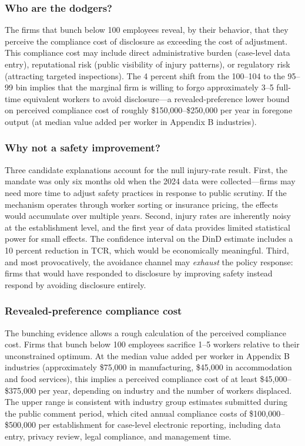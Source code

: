 \documentclass[12pt]{article}
\begin{document}
\subsubsection*{Who are the dodgers?} The firms that bunch below 100 employees reveal, by their behavior, that they perceive the compliance cost of disclosure as exceeding the cost of adjustment. This compliance cost may include direct administrative burden (case-level data entry), reputational risk (public visibility of injury patterns), or regulatory risk (attracting targeted inspections). The 4 percent shift from the 100--104 to the 95--99 bin implies that the marginal firm is willing to forgo approximately 3--5 full-time equivalent workers to avoid disclosure---a revealed-preference lower bound on perceived compliance cost of roughly \$150,000--\$250,000 per year in foregone output (at median value added per worker in Appendix B industries).

\subsubsection*{Why not a safety improvement?} Three candidate explanations account for the null injury-rate result. First, the mandate was only six months old when the 2024 data were collected---firms may need more time to adjust safety practices in response to public scrutiny. If the mechanism operates through worker sorting or insurance pricing, the effects would accumulate over multiple years. Second, injury rates are inherently noisy at the establishment level, and the first year of data provides limited statistical power for small effects. The confidence interval on the DinD estimate includes a 10 percent reduction in TCR, which would be economically meaningful. Third, and most provocatively, the avoidance channel may \textit{exhaust} the policy response: firms that would have responded to disclosure by improving safety instead respond by avoiding disclosure entirely.

\subsubsection*{Revealed-preference compliance cost} The bunching evidence allows a rough calculation of the perceived compliance cost. Firms that bunch below 100 employees sacrifice 1--5 workers relative to their unconstrained optimum. At the median value added per worker in Appendix B industries (approximately \$75,000 in manufacturing, \$45,000 in accommodation and food services), this implies a perceived compliance cost of at least \$45,000--\$375,000 per year, depending on industry and the number of workers displaced. The upper range is consistent with industry group estimates submitted during the public comment period, which cited annual compliance costs of \$100,000--\$500,000 per establishment for case-level electronic reporting, including data entry, privacy review, legal compliance, and management time.
\end{document}
